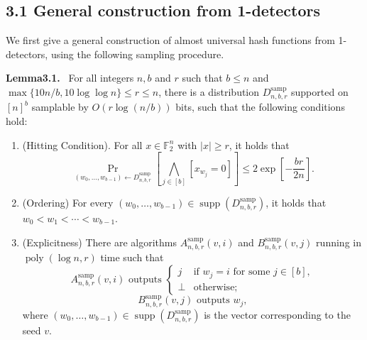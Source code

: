 \documentclass[10pt,a4paper]{article}
\newenvironment{authorclaim}[1]{\par\medskip\noindent\textbf{#1.}\ }{\par\medskip}
\begin{document}
\subsection*{3.1 General construction from 1-detectors}
We first give a general construction of almost universal hash functions from 1-detectors, using the following sampling procedure.
\begin{authorclaim}{Lemma3.1}
For all integers $n,b$ and $r$ such that $b\le n$ and $\max\{10n/b,10\log\log n\}\le r\le n$, there is a distribution $D^{\mathrm{samp}}_{n,b,r}$ supported on $[n]^b$ samplable by $O(r\log(n/b))$ bits, such that the following conditions hold:
\begin{enumerate}
\item (Hitting Condition). For all $x\in\mathbb F_2^n$ with $|x|\ge r$, it holds that
\begin{equation}\tag{1}
\Pr_{(w_0,\ldots,w_{b-1})\leftarrow D^{\mathrm{samp}}_{n,b,r}}\left[\bigwedge_{j\in[b]}[x_{w_j}=0]\right]\le2\exp\left[-\frac{br}{2n}\right].
\end{equation}
\item (Ordering) For every $(w_0,\ldots,w_{b-1})\in\operatorname{supp}(D^{\mathrm{samp}}_{n,b,r})$, it holds that $w_0<w_1<\cdots<w_{b-1}$.
\item (Explicitness) There are algorithms $A^{\mathrm{samp}}_{n,b,r}(v,i)$ and $B^{\mathrm{samp}}_{n,b,r}(v,j)$ running in $\operatorname{poly}(\log n,r)$ time such that
\[A^{\mathrm{samp}}_{n,b,r}(v,i)\text{ outputs }\begin{cases}j&\text{if }w_j=i\text{ for some }j\in[b],\\\bot&\text{otherwise;}\end{cases}\]
\[B^{\mathrm{samp}}_{n,b,r}(v,j)\text{ outputs }w_j,\]
where $(w_0,\ldots,w_{b-1})\in\operatorname{supp}(D^{\mathrm{samp}}_{n,b,r})$ is the vector corresponding to the seed $v$.
\end{enumerate}
\end{authorclaim}
\end{document}
